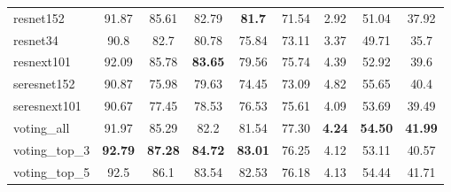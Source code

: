 \begin{table}[H]
\begin{tabular}{lcccc|cccc}
        \\
        resnet152           & 91.87                                & 85.61
                            & 82.79                                &
        \textbf{81.7}       & 71.54                                &
        2.92                & 51.04                                & 37.92

        \\
        resnet34            & 90.8                                 & 82.7
                            & 80.78                                & 75.84
                            & 73.11                                & 3.37
                            &
        49.71               & 35.7

        \\
        resnext101          & 92.09                                & 85.78
                            & \textbf{83.65}                       & 79.56
                            & 75.74                                &
        4.39                & 52.92                                & 39.6

        \\
        seresnet152         & 90.87                                & 75.98
                            & 79.63                                & 74.45
                            & 73.09                                & 4.82
                            &
        55.65               & 40.4

        \\
        seresnext101        & 90.67                                & 77.45
                            & 78.53                                & 76.53
                            & 75.61                                & 4.09
                            &
        53.69               & 39.49

        \\
        \midrule
        voting\_all         & 91.97                                & 85.29
                            & 82.2                                 & 81.54
                            & 77.30                                &
        \textbf{4.24}
                            & \textbf{54.50}                       &
        \textbf{41.99}
        \\
        voting\_top\_3      & \textbf{92.79}                       &
        \textbf{87.28}      & \textbf{84.72}                       &
        \textbf{83.01}      & 76.25                                & 4.12
                            & 53.11                                & 40.57
        \\
        voting\_top\_5      & 92.5                                 & 86.1
                            & 83.54                                & 82.53
                            & 76.18                                & 4.13
                            &
        54.44               & 41.71


\end{tabular}
\end{table}
